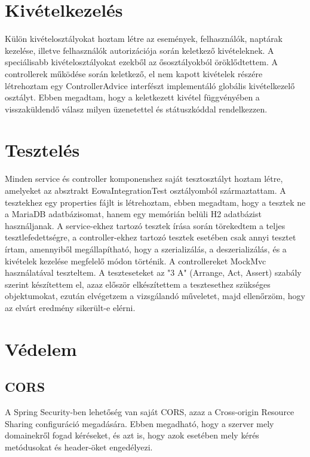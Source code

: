 \documentclass[a4paper,12pt]{report}
\theoremstyle{definition}
\theoremstyle{remark}
\begin{document}
\section{Kivételkezelés}

Külön kivételosztályokat hoztam létre az események, felhasználók, naptárak kezelése, illetve felhasználók autorizációja során keletkező kivételeknek. A speciálisabb kivételosztályokat ezekből az ősosztályokból öröklődtettem. A controllerek működése során keletkező, el nem kapott kivételek részére létrehoztam egy ControllerAdvice interfészt implementáló globális kivételkezelő osztályt. Ebben megadtam, hogy a keletkezett kivétel függvényében a visszaküldendő válasz milyen üzenetettel és státuszkóddal rendelkezzen.

\section{Tesztelés}

Minden service és controller komponenshez saját tesztosztályt hoztam létre, amelyeket az absztrakt EowaIntegrationTest osztályomból származtattam.  A tesztekhez egy properties fájlt is létrehoztam, ebben megadtam, hogy a tesztek ne a MariaDB adatbázisomat, hanem egy memórián belüli H2 adatbázist használjanak. A service-ekhez tartozó tesztek írása során törekedtem a teljes tesztlefedettségre, a controller-ekhez tartozó tesztek esetében csak annyi tesztet írtam, amennyiből megállapítható, hogy a szerializálás, a deszerializálás, és a kivételek kezelése megfelelő módon történik. A controllereket MockMvc használatával teszteltem. A teszteseteket az "3 A" (Arrange, Act, Assert) szabály szerint készítettem el, azaz először elkészítettem a tesztesethez szükséges objektumokat, ezután elvégetzem a vizsgálandó műveletet, majd ellenőrzöm, hogy az elvárt eredmény sikerült-e elérni.


\section{Védelem}

	\subsection{CORS}

A Spring Security-ben lehetőség van saját CORS, azaz a Cross-origin Resource Sharing configuráció megadására. Ebben megadható, hogy a szerver mely domainekről fogad kéréseket, és azt is, hogy azok esetében mely kérés metódusokat és header-öket engedélyezi. 
\end{document}
